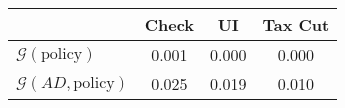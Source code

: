 \begin{tabular}{@{}lccc@{}} 
\toprule 
                          & Check      & UI    & Tax Cut    \\  \midrule 
$\mathcal{G}(\text{policy})$ & 0.001  & 0.000  & 0.000     \\ 
$\mathcal{G}(AD,\text{policy})$ & 0.025  & 0.019  & 0.010     \\ 
\end{tabular}  
